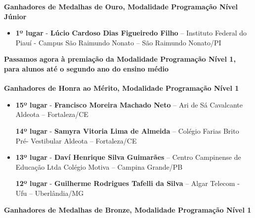 \documentclass{article}
\begin{document}
\textbf{\color{blue}Ganhadores de Medalhas de Ouro, \color{black}Modalidade Programação Nível Júnior}
\color{black}

\begin{itemize}
\item
\textbf{1º lugar} - \textbf{Lúcio Cardoso Dias Figueiredo Filho} – Instituto Federal do Piauí - Campus São Raimundo Nonato – São Raimundo Nonato/PI



\end{itemize}

\color{blue}
\textbf{Passamos agora à premiação da Modalidade Programação Nível 1, para alunos até o segundo ano do ensino médio}\\\\
\textbf{\color{blue}Ganhadores de Honra ao Mérito, \color{black}Modalidade Programação Nível 1}
\color{black}

\begin{itemize}
\item
\textbf{15º lugar} - \textbf{Francisco Moreira Machado Neto} – Ari de Sá Cavalcante Aldeota – Fortaleza/CE


\textbf{14º lugar} - \textbf{Samyra Vitoria Lima de Almeida} – Colégio Farias Brito Pré- Vestibular Aldeota – Fortaleza/CE



\item
\textbf{13º lugar} - \textbf{Daví Henrique Silva Guimarães} – Centro Campinense de Educação Ltda Colégio Motiva – Campina Grande/PB


\textbf{12º lugar} - \textbf{Guilherme Rodrigues Tafelli da Silva} – Algar Telecom - Ufu – Uberlândia/MG



\end{itemize}

\textbf{\color{blue}Ganhadores de Medalhas de Bronze, \color{black}Modalidade Programação Nível 1}
\color{black}
\end{document}

